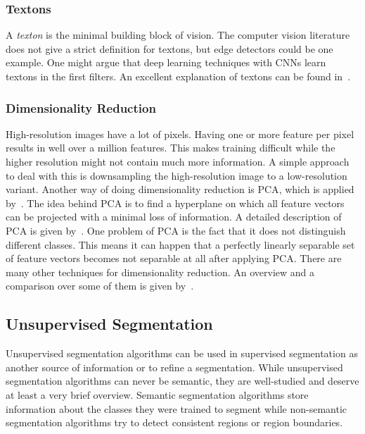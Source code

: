 \documentclass[technote,a4paper,leqno]{IEEEtran}
\begin{document}
\subsubsection{Textons}\label{subsubsec:textons}
A \textit{texton} is the minimal building block of vision. The computer vision
literature does not give a strict definition for textons, but edge detectors
could be one example. One might argue that deep learning techniques with
\glspl{CNN} learn textons in the first filters.
An excellent explanation of textons can be found in~\cite{zhu2005textons}.
\subsubsection{Dimensionality Reduction}
High-resolution images have a lot of pixels. Having one or more feature per
pixel results in well over a million features. This makes training difficult
while the higher resolution might not contain much more information. A simple
approach to deal with this is downsampling the high-resolution image to a
low-resolution variant. Another way of doing dimensionality reduction is
\gls{PCA}, which is applied by~\cite{chen2011pixel}. The idea behind \gls{PCA}
is to find a hyperplane on which all feature vectors can be projected with a
minimal loss of information. A detailed description of \gls{PCA} is given
by~\cite{smith2002tutorial}.
One problem of \gls{PCA} is the fact that it does not distinguish different
classes. This means it can happen that a perfectly linearly separable set of
feature vectors becomes not separable at all after applying \gls{PCA}.
There are many other techniques for dimensionality reduction. An overview and
a comparison over some of them is given by~\cite{van2009dimensionality}.
\subsection{Unsupervised Segmentation}%
\label{subsec:unsupervised-traditional-segmentation}%
Unsupervised segmentation algorithms can be used in supervised segmentation as
another source of information or to refine a segmentation. While unsupervised
segmentation algorithms can never be semantic, they are well-studied and
deserve at least a very brief overview.
Semantic segmentation algorithms store information about the classes they were
trained to segment while non-semantic segmentation algorithms try to detect
consistent regions or region boundaries.
\end{document}
